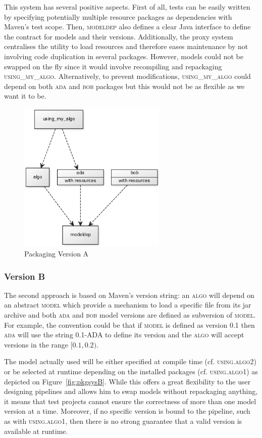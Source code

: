 \documentclass{article}
\newcommand{\ID}[1]{{\textsc{#1}}}
\begin{document}
This system has several positive aspects. First of all, tests can be easily written by specifying potentially multiple resource packages as dependencies with Maven's test scope. Then, \ID{modeldep} also defines a clear Java interface to define the contract for models and their versions. Additionally, the proxy system centralises the utility to load resources and therefore eases maintenance by not involving code duplication in several packages. However, models could not be swapped on the fly since it would involve recompiling and repackaging \ID{using\_my\_algo}.  Alternatively, to prevent modifications, \ID{using\_my\_algo} could depend on both \ID{ada} and \ID{bob} packages but this would not be as flexible as we want it to be.

\begin{figure}
\centering
\includegraphics[width=200pt]{res/packaging_version_A.png}
\caption{Packaging Version A}
\label{fig:pkgsysA}
\end{figure}


\subsubsection{Version B}

The second approach is based on Maven's version string: an \ID{algo} will depend on an abstract \ID{model} which provide a mechanism to load a specific file from its jar archive and both \ID{ada} and \ID{bob} model versions are defined as subversion of \ID{model}. For example, the convention could be that if \ID{model} is defined as version \ID{0.1} then \ID{ada} will use the string \ID{0.1-ADA} to define its version and the \ID{algo} will accept versions in the range $ [0.1,0.2) $.

The model actually used will be either specified at compile time (cf. \ID{using.algo2}) or be selected at runtime depending on the installed packages (cf. \ID{using.algo1}) as depicted on Figure~\ref{fig:pkgsysB}. While this offers a great flexibility to the user designing pipelines and allows him to swap models without repackaging anything, it means that test projects cannot ensure the correctness of more than one model version at a time. Moreover, if no specific version is bound to the pipeline, such as with \ID{using.algo1}, then there is no strong guarantee that a valid version is available at runtime.
\end{document}
